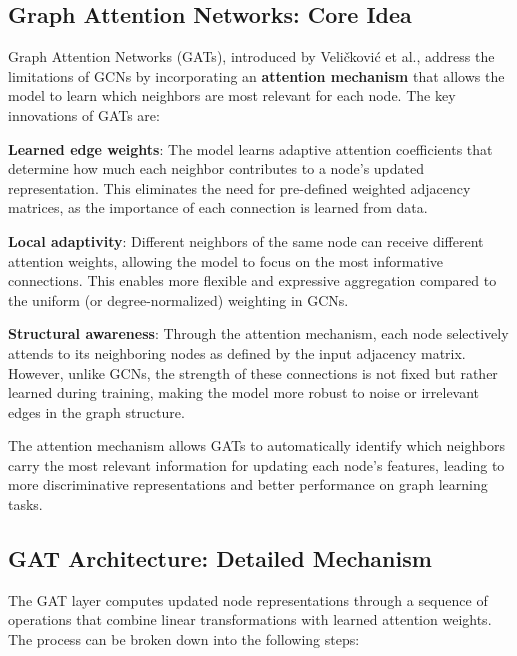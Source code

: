 \subsection{Graph Attention Networks: Core Idea}
Graph Attention Networks (GATs), introduced by Veličković et al., address the limitations of GCNs by incorporating an \textbf{attention mechanism} that allows the model to learn which neighbors are most relevant for each node. The key innovations of GATs are:
\begin{compactitemize}
\item \textbf{Learned edge weights}: The model learns adaptive attention coefficients that determine how much each neighbor contributes to a node's updated representation. This eliminates the need for pre-defined weighted adjacency matrices, as the importance of each connection is learned from data.
\item \textbf{Local adaptivity}: Different neighbors of the same node can receive different attention weights, allowing the model to focus on the most informative connections. This enables more flexible and expressive aggregation compared to the uniform (or degree-normalized) weighting in GCNs.
\item \textbf{Structural awareness}: Through the attention mechanism, each node selectively attends to its neighboring nodes as defined by the input adjacency matrix. However, unlike GCNs, the strength of these connections is not fixed but rather learned during training, making the model more robust to noise or irrelevant edges in the graph structure.
\end{compactitemize}
The attention mechanism allows GATs to automatically identify which neighbors carry the most relevant information for updating each node's features, leading to more discriminative representations and better performance on graph learning tasks.

\subsection{GAT Architecture: Detailed Mechanism}

The GAT layer computes updated node representations through a sequence of operations that combine linear transformations with learned attention weights. The process can be broken down into the following steps:

